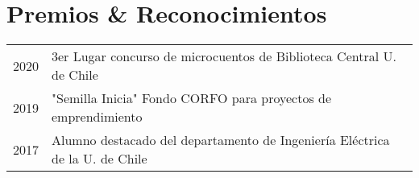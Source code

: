 \section{Premios \& Reconocimientos \faTrophy}
\begin{tabular}{r l}
\color{name}2020 &  3er Lugar concurso de microcuentos de Biblioteca Central U. de Chile\\
2019 & "Semilla Inicia" Fondo CORFO para proyectos de emprendimiento\\
2017 &  Alumno destacado del departamento de Ingeniería Eléctrica de la U. de Chile
\end{tabular}
\sectionsep